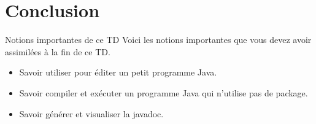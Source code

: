 \documentclass[a4paper,11pt]{style-esi/td}
\begin{document}
\section{Conclusion}

	\begin{theorie}{Notions importantes de ce TD}
		Voici les notions importantes que vous devez avoir assimilées à la fin de ce TD.
		\begin{itemize}
		\item 
			Savoir utiliser  pour éditer un petit programme Java.
		\item 
			Savoir compiler et exécuter un programme Java 
			qui n'utilise pas de package.
		\item 
			Savoir générer et visualiser la javadoc.
		\end{itemize}
	\end{theorie}


		
\end{document}
